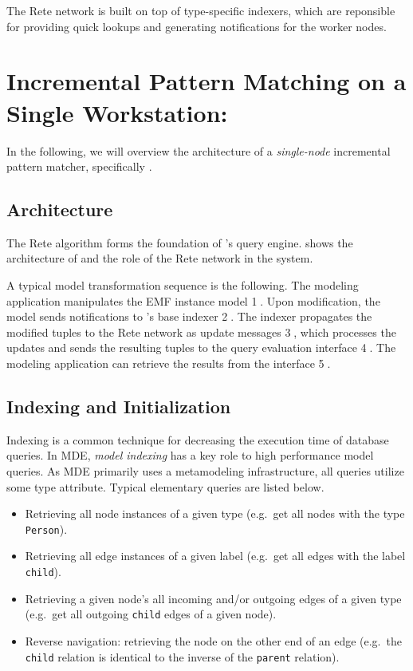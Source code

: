 The Rete network is built on top of type-specific indexers, which are reponsible for providing quick lookups and generating notifications for the worker nodes.




\section{Incremental Pattern Matching on a Single Workstation: \eiq{}}
\label{eiq-architecture}

In the following, we will overview the architecture of a \emph{single-node} incremental pattern matcher, specifically \eiq{}.

\subsection{Architecture}

The Rete algorithm forms the foundation of \eiq{}'s query engine.  shows the architecture of \eiq{} and the role of the Rete network in the system. 


A typical model transformation sequence is the following. The modeling application manipulates the EMF instance model \textcircled{1}. Upon modification, the model sends notifications to \eiq{}'s base indexer \textcircled{2}. The indexer propagates the modified tuples to the Rete network as update messages \textcircled{3}, which processes the updates and sends the resulting tuples to the query evaluation interface \textcircled{4}. The modeling application can retrieve the results from the interface \textcircled{5}.

\subsection{Indexing and Initialization}
\label{indexing}

Indexing is a common technique for decreasing the execution time of database queries. In MDE, \emph{model indexing} has a key role to high performance model queries. As MDE primarily uses a metamodeling infrastructure, all queries utilize some type attribute. Typical elementary queries are listed below.

\begin{itemize}
  \item Retrieving all node instances of a given type (e.g.\ get all nodes with the type \texttt{Person}).
  \item Retrieving all edge instances of a given label (e.g.\ get all edges with the label \texttt{child}).
  \item Retrieving a given node's all incoming and/or outgoing edges of a given type (e.g.\ get all outgoing \texttt{child} edges of a given node). 
  \item Reverse navigation: retrieving the node on the other end of an edge (e.g.\ the \texttt{child} relation is identical to the inverse of the \texttt{parent} relation). 
\end{itemize}


